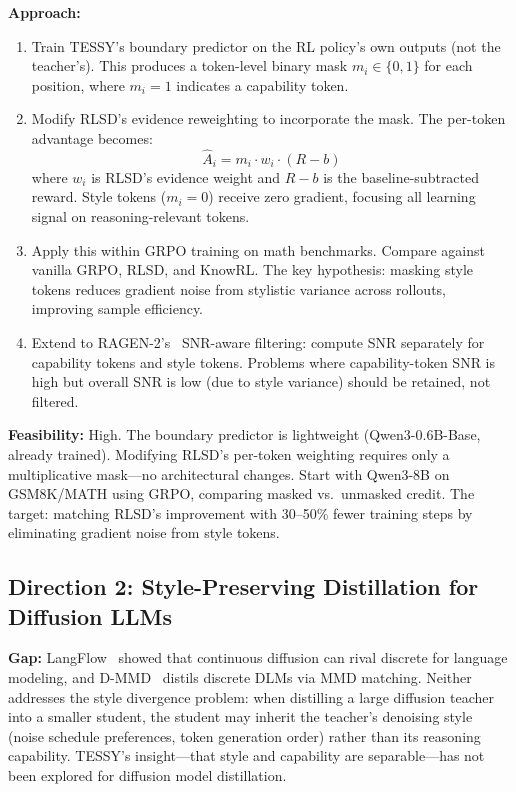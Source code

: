\documentclass[11pt]{article}
\begin{document}
\textbf{Approach:}
\begin{enumerate}
    \item Train TESSY's boundary predictor on the RL policy's own outputs (not the teacher's). This produces a token-level binary mask $m_i \in \{0, 1\}$ for each position, where $m_i = 1$ indicates a capability token.

    \item Modify RLSD's evidence reweighting to incorporate the mask. The per-token advantage becomes:
    \begin{equation}
        \hat{A}_i = m_i \cdot w_i \cdot (R - b)
    \end{equation}
    where $w_i$ is RLSD's evidence weight and $R - b$ is the baseline-subtracted reward. Style tokens ($m_i = 0$) receive zero gradient, focusing all learning signal on reasoning-relevant tokens.

    \item Apply this within GRPO training on math benchmarks. Compare against vanilla GRPO, RLSD, and KnowRL. The key hypothesis: masking style tokens reduces gradient noise from stylistic variance across rollouts, improving sample efficiency.

    \item Extend to RAGEN-2's~\cite{ragen2} SNR-aware filtering: compute SNR separately for capability tokens and style tokens. Problems where capability-token SNR is high but overall SNR is low (due to style variance) should be retained, not filtered.
\end{enumerate}

\textbf{Feasibility:} High. The boundary predictor is lightweight (Qwen3-0.6B-Base, already trained). Modifying RLSD's per-token weighting requires only a multiplicative mask---no architectural changes. Start with Qwen3-8B on GSM8K/MATH using GRPO, comparing masked vs.\ unmasked credit. The target: matching RLSD's improvement with 30--50\% fewer training steps by eliminating gradient noise from style tokens.

\subsection{Direction 2: Style-Preserving Distillation for Diffusion LLMs}

\textbf{Gap:} LangFlow~\cite{langflow} showed that continuous diffusion can rival discrete for language modeling, and D-MMD~\cite{dmmd} distils discrete DLMs via MMD matching. Neither addresses the style divergence problem: when distilling a large diffusion teacher into a smaller student, the student may inherit the teacher's denoising style (noise schedule preferences, token generation order) rather than its reasoning capability. TESSY's insight---that style and capability are separable---has not been explored for diffusion model distillation.
\end{document}
